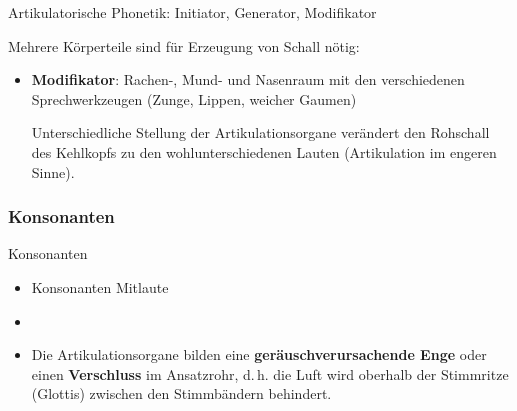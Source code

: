 \begin{frame}{Artikulatorische Phonetik: Initiator, Generator, Modifikator}

Mehrere Körperteile sind für Erzeugung von Schall nötig:

	\begin{itemize}
		\item \textbf{Modifikator}: Rachen-, Mund- und Nasenraum mit den verschiedenen Sprechwerkzeugen (Zunge, Lippen, weicher Gaumen) \ras
		
		Unterschiedliche Stellung der Artikulationsorgane verändert den Rohschall des Kehlkopfs zu den wohlunterschiedenen Lauten (Artikulation im engeren Sinne).
	\end{itemize}
	
\end{frame}


\subsubsection{Konsonanten}

\begin{frame}{Konsonanten}

	\begin{itemize}
		\item Konsonanten \ras Mitlaute
		\item[]
		\item Die Artikulationsorgane bilden eine \textbf{geräuschverursachende Enge} oder einen \textbf{Verschluss} im Ansatzrohr, d.\,h. die Luft wird oberhalb der Stimmritze (Glottis) zwischen den Stimmbändern behindert.
	\end{itemize}
	
\end{frame}


